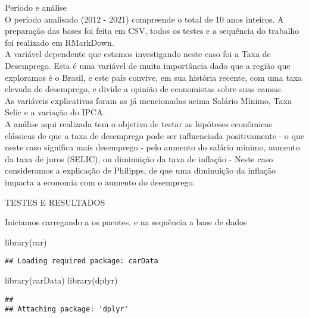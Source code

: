 \documentclass[
]{article}
\newenvironment{Shaded}{\begin{snugshade}}{\end{snugshade}}
\newcommand{\FunctionTok}[1]{\textcolor[rgb]{0.00,0.00,0.00}{#1}}
\newcommand{\NormalTok}[1]{#1}
\begin{document}
Período e análise\\
O período analisado (2012 - 2021) compreende o total de 10 anos
inteiros. A preparação das bases foi feita em CSV, todos os testes e a
sequência do trabalho foi realizado em RMarkDown.\\
A variável dependente que estamos investigando neste caso foi a Taxa de
Desemprego. Esta é uma variável de muita importância dado que a região
que exploramos é o Brasil, e este país convive, em sua história recente,
com uma taxa elevada de desemprego, e divide a opinião de economistas
sobre suas causas.\\
As variáveis explicativas foram as já mencionadas acima Salário Mínimo,
Taxa Selic e a variação do IPCA.\\
A análise aqui realizada tem o objetivo de testar as hipóteses
econômicas clássicas de que a taxa de desemprego pode ser influenciada
positivamente - o que neste caso significa mais desemprego - pelo
aumento do salário minimo, aumento da taxa de juros (SELIC), ou
diminuição da taxa de inflação - Neste caso consideramos a explicação de
Philipps, de que uma diminuição da inflação impacta a economia com o
aumento do desemprego.

TESTES E RESULTADOS

Iniciamos carregando a os pacotes, e na sequência a base de dados

\begin{Shaded}
\begin{Highlighting}[]
\FunctionTok{library}\NormalTok{(car)                                                                                   }
\end{Highlighting}
\end{Shaded}

\begin{verbatim}
## Loading required package: carData
\end{verbatim}

\begin{Shaded}
\begin{Highlighting}[]
\FunctionTok{library}\NormalTok{(carData)                                                                         }
\FunctionTok{library}\NormalTok{(dplyr)                                                                           }
\end{Highlighting}
\end{Shaded}

\begin{verbatim}
## 
## Attaching package: 'dplyr'
\end{verbatim}
\end{document}
